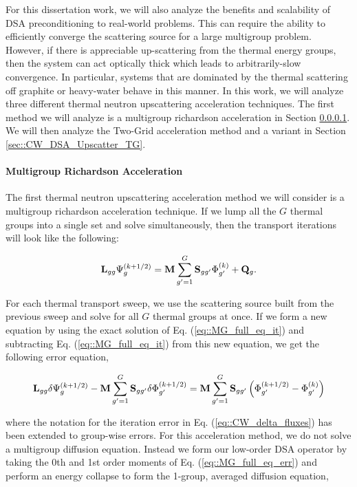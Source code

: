 \documentclass[11pt]{article}
\begin{document}
For this dissertation work, we will also analyze the benefits and scalability of DSA preconditioning to real-world problems. This can require the ability to efficiently converge the scattering source for a large multigroup problem. However, if there is appreciable up-scattering from the thermal energy groups, then the system can act optically thick which leads to arbitrarily-slow convergence. In particular, systems that are dominated by the thermal scattering off graphite or heavy-water behave in this manner. In this work, we will analyze three different thermal neutron upscattering acceleration techniques. The first method we will analyze is a multigroup richardson acceleration in Section \ref{sec::CW_DSA_Upscatter_Rich}. We will then analyze the Two-Grid acceleration method and a variant in Section \ref{sec::CW_DSA_Upscatter_TG}.

\paragraph{Multigroup Richardson Acceleration}
\label{sec::CW_DSA_Upscatter_Rich}

The first thermal neutron upscattering acceleration method we will consider is a multigroup richardson acceleration technique. If we lump all the $G$ thermal groups into a single set and solve simultaneously, then the transport iterations will look like the following:

\begin{equation}
\label{eq::MG_full_eq_it}
{\bf L}_{gg} \Psi_g^{(k+1/2)} =  {\bf M} \sum_{g'=1}^G {\bf S}_{g g'} \Phi_{g'}^{(k)} + {\bf Q}_g.
\end{equation}

\noindent For each thermal transport sweep, we use the scattering source built from the previous sweep and solve for all $G$ thermal groups at once. If we form a new equation by using the exact solution of Eq. (\ref{eq::MG_full_eq_it}) and subtracting Eq. (\ref{eq::MG_full_eq_it}) from this new equation, we get the following error equation, 

\begin{equation}
\label{eq::MG_full_eq_err}
{\bf L}_{gg} \delta \Psi_g^{(k+1/2)} - {\bf M} \sum_{g'=1}^G {\bf S}_{g g'} \delta \Phi_{g'}^{(k+1/2)}=  {\bf M} \sum_{g'=1}^G {\bf S}_{g g'}\left( \Phi_{g'}^{(k+1/2)}- \Phi_{g'}^{(k)} \right)
\end{equation}

\noindent where the notation for the iteration error in Eq. (\ref{eq::CW_delta_fluxes}) has been extended to group-wise errors. For this acceleration method, we do not solve a multigroup diffusion equation. Instead we form our low-order DSA operator by taking the 0th and 1st order moments of Eq. (\ref{eq::MG_full_eq_err}) and perform an energy collapse to form the 1-group, averaged diffusion equation,
\end{document}
